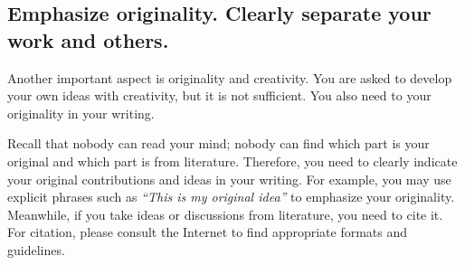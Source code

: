 \documentclass[11pt,pdfa,lastpage,minititle]{MishoNote}
\begin{document}
\subsection{Emphasize originality. Clearly separate your work and others.}
Another important aspect is originality and creativity.
You are asked to develop your own ideas with creativity, but it is not sufficient. You also need to  your originality in your writing.

Recall that nobody can read your mind; nobody can find which part is your original and which part is from literature.
Therefore, you need to clearly indicate your original contributions and ideas in your writing.
For example, you may use explicit phrases such as \emph{``This is my original idea''} to emphasize your originality.
Meanwhile, if you take ideas or discussions from literature, you need to cite it. For citation, please consult the Internet to find appropriate formats and guidelines.


\end{document}
